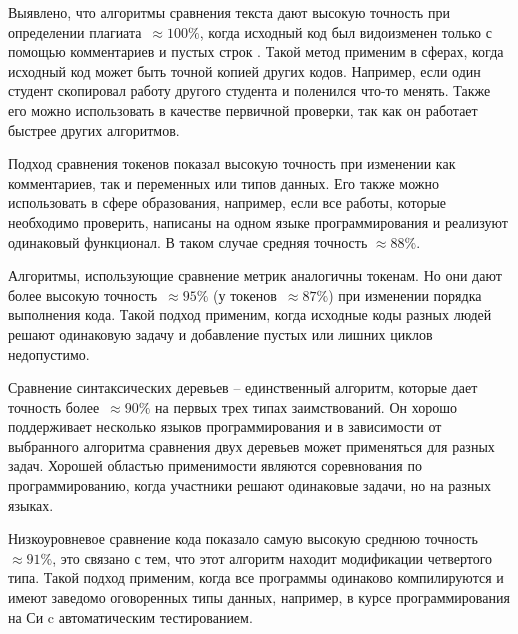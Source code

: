 \pagebreak
Выявлено, что алгоритмы сравнения текста дают высокую точность при определении плагиата~$\approx{100\%}$, когда исходный код был видоизменен только с помощью комментариев и пустых строк . Такой метод применим в сферах, когда исходный код может быть точной копией других кодов. Например, если один студент скопировал работу другого студента и поленился что-то менять. Также его можно использовать в качестве первичной проверки, так как он работает быстрее других алгоритмов. 

Подход сравнения токенов показал высокую точность при изменении как комментариев, так и переменных или типов данных. Его также можно использовать в сфере образования, например, если все работы, которые необходимо проверить, написаны на одном языке программирования и реализуют одинаковый функционал. В таком случае средняя точность $\approx{88\%}$.

Алгоритмы, использующие сравнение метрик аналогичны токенам. Но они дают более высокую точность~$\approx{95\%}$ (у токенов~$\approx{87\%}$) при изменении порядка выполнения кода. Такой подход применим, когда исходные коды разных людей решают одинаковую задачу и добавление пустых или лишних циклов недопустимо.

Сравнение синтаксических деревьев -- единственный алгоритм, которые дает точность более~$\approx{90\%}$ на первых трех типах заимствований. Он хорошо поддерживает несколько языков программирования и в зависимости от выбранного алгоритма сравнения двух деревьев может применяться для разных задач. Хорошей областью применимости являются соревнования по программированию, когда участники решают одинаковые задачи, но на разных языках.

Низкоуровневое сравнение кода показало самую высокую среднюю точность~$\approx{91\%}$, это связано с тем, что этот алгоритм находит модификации четвертого типа.  Такой подход применим, когда все программы одинаково компилируются и имеют заведомо оговоренных типы данных, например, в курсе программирования на Си c автоматическим тестированием.
